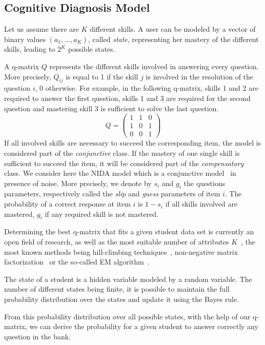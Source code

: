 \documentclass{sig-alternate}
\begin{document}
\subsection{Cognitive Diagnosis Model}

Let us assume there are $K$ different skills. A user can be modeled by a vector of binary values $(a_1, \ldots, a_K)$, called \emph{state}, representing her mastery of the different skills, leading to $2^K$ possible states.

A q-matrix $Q$ \citep{Tatsuoka1983} represents the different skills involved in answering every question. More precisely, $Q_{ij}$ is equal to 1 if the skill $j$ is involved in the resolution of the question $i$, 0 otherwise. For example, in the following q-matrix, skills 1 and 2 are required to answer the first question, skills 1 and 3 are required for the second question and mastering skill 3 is sufficient to solve the last question.
\[ Q = \left(\begin{array}{lll}
1 & 1 & 0\\
1 & 0 & 1\\
0 & 0 & 1
\end{array}\right) \]
If all involved skills are necessary to succeed the corresponding item, the model is considered part of the \emph{conjunctive} class. 
If the mastery of one single skill is sufficient to succeed the item, it will be considered part of the \emph{compensatory} class. We consider here the NIDA model which is a conjunctive model~\citep{Desmarais2012} in presence of noise. More precisely, we denote by $s_i$ and $g_i$ the questions parameters, respectively called the \emph{slip} and \emph{guess} parameters of item $i$. The probability of a correct response at item $i$ is $1 - s_i$ if all skills involved are mastered, $g_i$ if any required skill is not mastered.

Determining the best q-matrix that fits a given student data set is currently an open field of research, as well as the most suitable number of attributes $K$~\citep{Huebner2010}, the most known methods being hill-climbing techniques~\citep{Barnes2005}, non-negative matrix factorization~\citep{Desmarais2011} or the so-called EM algorithm~\citep{Huebner2010}. 

The state of a student is a hidden variable modeled by a random variable. The number of different states being finite, it is possible to maintain the full probability distribution over the states and update it using the Bayes rule.

From this probability distribution over all possible states, with the help of our q-matrix, we can derive the probability for a given student to answer correctly any question in the bank.
\end{document}
